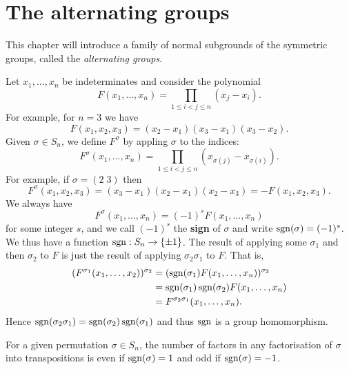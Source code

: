\chapter{The alternating groups}

This chapter will introduce a family of normal subgrounds of the symmetric groups,
called the \emph{alternating groups}.

Let $x_1, \ldots, x_n$ be indeterminates and consider the polynomial
\[
    F(x_1, \ldots, x_n) = \prod_{1 \leq i < j \leq n} (x_j - x_i).
\]
For example, for $n = 3$ we have
\[
    F(x_1,x_2,x_3) = (x_2 - x_1)(x_3 - x_1)(x_3 - x_2).
\]
Given $\sigma \in S_n$, we define $F^\sigma$ by appling $\sigma$ to the indices:
\[
    F^\sigma(x_1, \ldots, x_n) = \prod_{1 \leq i < j \leq n} (x_{\sigma(j)} - x_{\sigma(i)}).
\]
For example, if $\sigma = (2\;3)$ then
\[
    F^\sigma(x_1, x_2, x_3) = (x_3 - x_1)(x_2 - x_1)(x_2 - x_3) = -F(x_1, x_2, x_3).
\]
We always have
\[
    F^\sigma(x_1, \ldots, x_n) = (-1)^s F(x_1, \ldots, x_n)
\]
for some integer $s$, and we call $(-1)^s$ the \textbf{sign} of $\sigma$
and write $\operatorname{sgn}(\sigma) = (-1)^s$.
We thus have a function $\operatorname{sgn}: S_n \to \{\pm 1\}$.
The result of applying some $\sigma_1$ and then $\sigma_2$ to $F$
is just the result of applying $\sigma_2\sigma_1$ to $F$.
That is,
\begin{align*}
    (F^{\sigma_1}(x_1,\ldots,x_2))^{\sigma_2}
    &= (\operatorname{sgn}(\sigma_1) F(x_1,\ldots,x_n))^{\sigma_2} \\
    &= \operatorname{sgn}(\sigma_1)\operatorname{sgn}(\sigma_2) F(x_1, \ldots, x_n) \\
    &= F^{\sigma_2\sigma_1}(x_1,\ldots,x_n).
\end{align*}
Hence $\operatorname{sgn}(\sigma_2\sigma_1) = \operatorname{sgn}(\sigma_2)\operatorname{sgn}(\sigma_1)$
and thus $\operatorname{sgn}$ is a group homomorphism.

\begin{theorem}[]
    For a given permutation $\sigma \in S_n$,
    the number of factors in any factorisation of $\sigma$ into transpositions
    is even if $\operatorname{sgn}(\sigma) = 1$ and odd if $\operatorname{sgn}(\sigma) = -1$.
\end{theorem}

